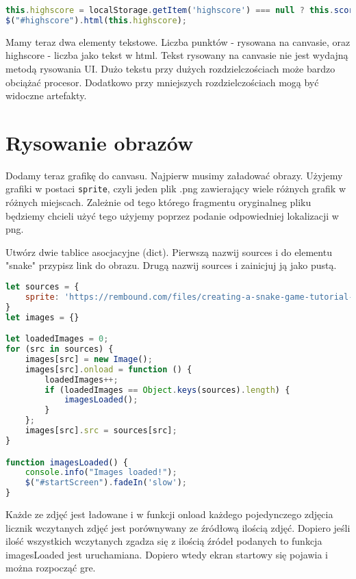 \documentclass[12pt]{article}
\begin{document}
\begin{lstlisting}[language=JavaScript]
this.highscore = localStorage.getItem('highscore') === null ? this.score() : Number(localStorage.getItem('highscore'));
$("#highscore").html(this.highscore);
\end{lstlisting}

Mamy teraz dwa elementy tekstowe. Liczba punktów - rysowana na canvasie, oraz highscore - liczba jako tekst w html. Tekst rysowany na canvasie nie jest wydajną metodą rysowania UI. Dużo tekstu przy dużych rozdzielczościach może bardzo obciążać procesor. Dodatkowo przy mniejszych rozdzielczościach mogą być widoczne artefakty.




\section{Rysowanie obrazów}
Dodamy teraz grafikę do canvasu. Najpierw musimy załadować obrazy. Użyjemy grafiki w postaci \texttt{sprite}, czyli jeden plik .png zawierający wiele różnych grafik w różnych miejscach. Zależnie od tego którego fragmentu oryginalneg pliku będziemy chcieli użyć tego użyjemy poprzez podanie odpowiedniej lokalizacji w png.

Utwórz dwie tablice asocjacyjne (dict). Pierwszą nazwij sources i do elementu "snake" przypisz link do obrazu. Drugą nazwij sources i zainicjuj ją jako pustą.

\begin{lstlisting}[language=JavaScript]
let sources = {
    sprite: 'https://rembound.com/files/creating-a-snake-game-tutorial-with-html5/snake-graphics.png'
}
let images = {}

let loadedImages = 0;
for (src in sources) {
    images[src] = new Image();
    images[src].onload = function () {
        loadedImages++;
        if (loadedImages == Object.keys(sources).length) {
            imagesLoaded();
        }
    };
    images[src].src = sources[src];
}

function imagesLoaded() {
    console.info("Images loaded!");
    $("#startScreen").fadeIn('slow');
}
\end{lstlisting}

Każde ze zdjęć jest ładowane i w funkcji onload każdego pojedynczego zdjęcia licznik wczytanych zdjęć jest porównywany ze źródłową ilością zdjęć. Dopiero jeśli ilość wszystkich wczytanych zgadza się z ilością źródeł podanych to funkcja imagesLoaded jest uruchamiana. Dopiero wtedy ekran startowy się pojawia i można rozpocząć gre.
\end{document}
